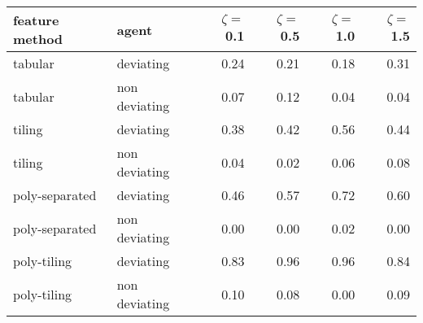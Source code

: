 \begin{tabular}{llrrrr}
  \hline
feature method & agent & $\zeta =$ 0.1 & $\zeta =$ 0.5 & $\zeta =$ 1.0 & $\zeta =$ 1.5 \\ 
  \hline
tabular & deviating & 0.24 & 0.21 & 0.18 & 0.31 \\ 
  tabular & non deviating & 0.07 & 0.12 & 0.04 & 0.04 \\ 
  tiling & deviating & 0.38 & 0.42 & 0.56 & 0.44 \\ 
  tiling & non deviating & 0.04 & 0.02 & 0.06 & 0.08 \\ 
  poly-separated & deviating & 0.46 & 0.57 & 0.72 & 0.60 \\ 
  poly-separated & non deviating & 0.00 & 0.00 & 0.02 & 0.00 \\ 
  poly-tiling & deviating & 0.83 & 0.96 & 0.96 & 0.84 \\ 
  poly-tiling & non deviating & 0.10 & 0.08 & 0.00 & 0.09 \\ 
   \hline
\end{tabular}
